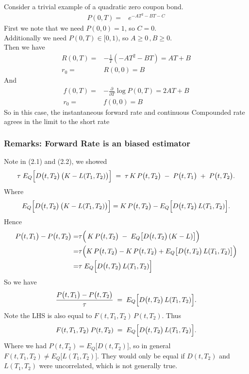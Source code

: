 Consider a trivial example of a quadratic zero coupon bond.
\begin{align*}
    P(0, T) =& e^{-A T^2 -B T - C} 
\end{align*}
First we note that we need $P(0, 0) = 1$, so $C = 0$.\\
Additionally we need $P(0, T) \in [0, 1)$, so $A \geq 0 \, , B \geq 0$.\\
Then we have
\begin{align*}
    R(0, T) =& -\frac{1}{T} (-A T^2 -B T) = A T + B \\
    r_0 =& R(0, 0) = B
\end{align*}
And
\begin{align*}
    f(0, T) =& -\frac{\partial}{\partial T} \log P(0, T) = 2 A T + B \\
    r_0 =& f(0, 0) = B
\end{align*}
So in this case, the instantaneous forward rate and continuous Compounded rate
agrees in the limit to the short rate

\subsubsection{Remarks: Forward Rate is an biased estimator}

Note in (2.1) and (2.2), we showed
\[
    \tau \;E_Q\Bigl[D\bigl(t, T_2\bigr)\,\bigl(K - L(T_1, T_2)\bigr)\Bigr]
    \;=\; \tau\,K \,P\bigl(t, T_2\bigr) \;-\; P\bigl(t, T_1\bigr) \;+\; P\bigl(t, T_2\bigr).
\]
Where
\[
    E_Q\Bigl[D\bigl(t, T_2\bigr)\,\bigl(K - L(T_1, T_2)\bigr)\Bigr]
    = K \,P\bigl(t, T_2\bigr) - E_Q\Bigl[D\bigl(t, T_2\bigr)\,L(T_1, T_2)\Bigr].
\]
Hence
\begin{align*}
    P\bigl(t, T_1\bigr) - P\bigl(t, T_2\bigr) 
    =& \tau \Bigl(\,K\,P\bigl(t, T_2\bigr) \;-\; E_Q\bigl[D\bigl(t, T_2\bigr)\,(K - L)\bigr]\Bigr)\\
    =& \tau \Bigl(K \,P\bigl(t, T_2\bigr) - K\,P\bigl(t, T_2\bigr) 
    + E_Q\bigl[D\bigl(t, T_2\bigr)\,L(T_1, T_2)\bigr]\Bigr) \\
    =& \tau\;E_Q\Bigl[D\bigl(t, T_2\bigr)\,L(T_1, T_2)\Bigr]
\end{align*}
So we have
\[
    \frac{P\bigl(t, T_1\bigr) - P\bigl(t, T_2\bigr)}{\tau}
    \;=\; E_Q\Bigl[D\bigl(t, T_2\bigr)\,L(T_1, T_2)\Bigr].
\]
Note the LHS is also equal to \(F(t, T_1, T_2)\,P(t, T_2)\). Thus
\[
    F(t, T_1, T_2)\;P(t, T_2)
    \;=\; E_Q\Bigl[D\bigl(t, T_2\bigr)\,L(T_1, T_2)\Bigr].
\]
Where we had \(P(t, T_2) = E_Q\bigl[D(t, T_2)\bigr]\), so in general \(F(t, T_1, T_2)\neq E_Q\bigl[L(T_1, T_2)\bigr]\). 
They would only be equal if \(D(t, T_2)\) and \(L(T_1, T_2)\) were uncorrelated, which is not generally true.

